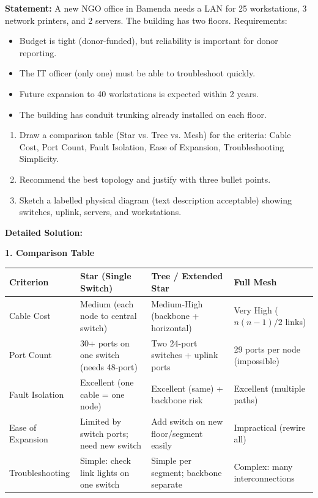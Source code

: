 \documentclass[11pt]{article}
\begin{document}
\begin{exoresolu}
\textbf{Statement:} 
A new NGO office in Bamenda needs a LAN for 25 workstations, 3 network printers, and 2 servers. The building has two floors. Requirements:
\begin{itemize}
\item Budget is tight (donor-funded), but reliability is important for donor reporting.
\item The IT officer (only one) must be able to troubleshoot quickly.
\item Future expansion to 40 workstations is expected within 2 years.
\item The building has conduit trunking already installed on each floor.
\end{itemize}
\begin{enumerate}
\item Draw a comparison table (Star vs. Tree vs. Mesh) for the criteria: Cable Cost, Port Count, Fault Isolation, Ease of Expansion, Troubleshooting Simplicity.
\item Recommend the best topology and justify with three bullet points.
\item Sketch a labelled physical diagram (text description acceptable) showing switches, uplink, servers, and workstations.
\end{enumerate}
\tcblower
\textbf{Detailed Solution:}

\textbf{1. Comparison Table}

\begin{center}
\begin{tabularx}{\linewidth}{|l|X|X|X|}\hline
\rowcolor{popblueL}
\textbf{Criterion} & \textbf{Star (Single Switch)} & \textbf{Tree / Extended Star} & \textbf{Full Mesh} \\ \hline
Cable Cost & Medium (each node to central switch) & Medium-High (backbone + horizontal) & Very High ($n(n-1)/2$ links) \\ \hline
Port Count & 30+ ports on one switch (needs 48-port) & Two 24-port switches + uplink ports & 29 ports per node (impossible) \\ \hline
Fault Isolation & Excellent (one cable = one node) & Excellent (same) + backbone risk & Excellent (multiple paths) \\ \hline
Ease of Expansion & Limited by switch ports; need new switch & Add switch on new floor/segment easily & Impractical (rewire all) \\ \hline
Troubleshooting & Simple: check link lights on one switch & Simple per segment; backbone separate & Complex: many interconnections \\ \hline
\end{tabularx}
\end{center}


\end{exoresolu}
\end{document}
